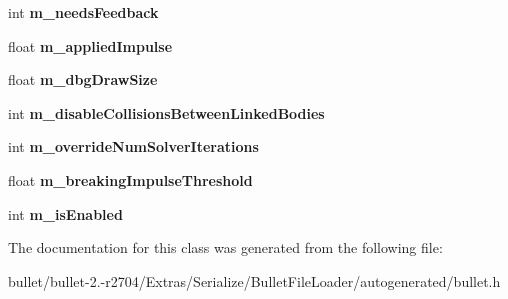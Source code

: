 \begin{DoxyCompactItemize}
\item 
\hypertarget{class_bullet_1_1bt_typed_constraint_data_ad6dcb4128b579059598dc8c6fdaf0486}{int {\bfseries m\+\_\+needs\+Feedback}}\label{class_bullet_1_1bt_typed_constraint_data_ad6dcb4128b579059598dc8c6fdaf0486}

\item 
\hypertarget{class_bullet_1_1bt_typed_constraint_data_a3865ebbf214803447cf6f3de57dd6b19}{float {\bfseries m\+\_\+applied\+Impulse}}\label{class_bullet_1_1bt_typed_constraint_data_a3865ebbf214803447cf6f3de57dd6b19}

\item 
\hypertarget{class_bullet_1_1bt_typed_constraint_data_a0b29c0da1393bc4c44040bf9d6f8523c}{float {\bfseries m\+\_\+dbg\+Draw\+Size}}\label{class_bullet_1_1bt_typed_constraint_data_a0b29c0da1393bc4c44040bf9d6f8523c}

\item 
\hypertarget{class_bullet_1_1bt_typed_constraint_data_afc19ea93f57c7fd1f85f94f5d8cb1308}{int {\bfseries m\+\_\+disable\+Collisions\+Between\+Linked\+Bodies}}\label{class_bullet_1_1bt_typed_constraint_data_afc19ea93f57c7fd1f85f94f5d8cb1308}

\item 
\hypertarget{class_bullet_1_1bt_typed_constraint_data_a3deb95ac68882c63aa14fd5a418856f0}{int {\bfseries m\+\_\+override\+Num\+Solver\+Iterations}}\label{class_bullet_1_1bt_typed_constraint_data_a3deb95ac68882c63aa14fd5a418856f0}

\item 
\hypertarget{class_bullet_1_1bt_typed_constraint_data_a0153abe668c8133a7402bf82c0b6d963}{float {\bfseries m\+\_\+breaking\+Impulse\+Threshold}}\label{class_bullet_1_1bt_typed_constraint_data_a0153abe668c8133a7402bf82c0b6d963}

\item 
\hypertarget{class_bullet_1_1bt_typed_constraint_data_a45cb97402b0ff25b22371152656a6ff8}{int {\bfseries m\+\_\+is\+Enabled}}\label{class_bullet_1_1bt_typed_constraint_data_a45cb97402b0ff25b22371152656a6ff8}

\end{DoxyCompactItemize}


The documentation for this class was generated from the following file\+:\begin{DoxyCompactItemize}
\item 
bullet/bullet-\/2.-\/r2704/\+Extras/\+Serialize/\+Bullet\+File\+Loader/autogenerated/bullet.\+h\end{DoxyCompactItemize}
